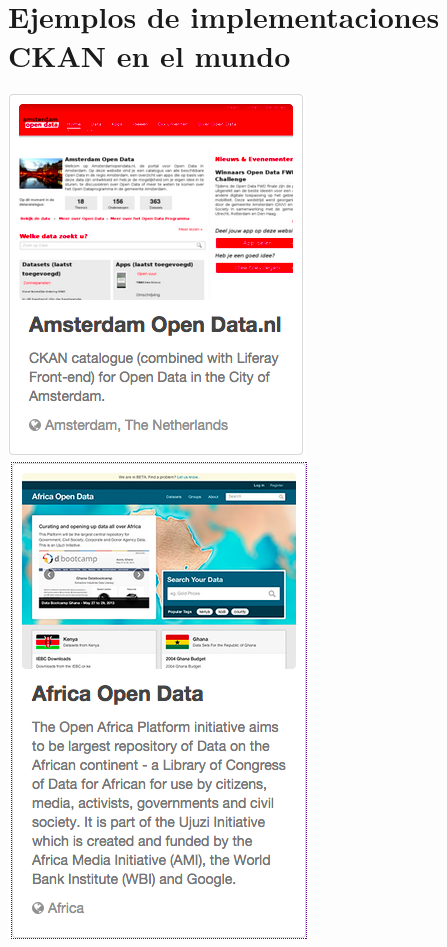 \chapter{Ejemplos de implementaciones CKAN en el mundo}
 \centering
\includegraphics{Images/AmsterdamOpenData} \\
\includegraphics{Images/AfricaOpenData} \\
